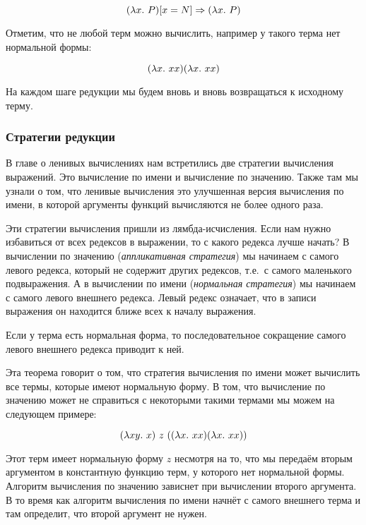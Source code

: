 \[ (\lambda x .\  P)[x = N] \Rightarrow (\lambda x .\  P) \]

Отметим, что не любой терм можно вычислить, например у такого
терма нет нормальной формы:

\[ (\lambda x .\  x x)(\lambda x .\  x x) \]

На каждом шаге редукции мы будем вновь и вновь возвращаться 
к исходному терму.  

\subsubsection{Стратегии редукции}

В главе о ленивых вычислениях нам встретились две стратегии
вычисления выражений. Это вычисление по имени и вычисление по 
значению. Также там мы узнали о том, что ленивые вычисления
это улучшенная версия вычисления по имени, в которой аргументы
функций вычисляются не более одного раза. 

Эти стратегии вычисления пришли из лямбда-исчисления.
Если нам нужно избавиться от всех редексов в выражении, 
то с какого редекса лучше начать? В вычислении по значению
(\emph{аппликативная стратегия})
мы начинаем с самого левого редекса, который не содержит других редексов,
т.е.~с самого маленького подвыражения. А в вычислении по имени
(\emph{нормальная стратегия})
мы начинаем с самого левого внешнего редекса. Левый редекс означает,
что в записи выражения он находится ближе всех к началу выражения.

\begin{Ltheorem}[Карри]

Если у терма есть нормальная форма, то последовательное 
сокращение самого левого внешнего редекса приводит к ней.

\end{Ltheorem}

Эта теорема говорит о том, что стратегия вычисления по имени
может вычислить все термы, которые имеют нормальную форму.
В том, что вычисление по значению может не справиться с 
некоторыми такими термами мы можем на следующем примере:

\[ (\lambda x y .\  x)\ z\ ((\lambda x .\  xx) (\lambda x .\  xx)) \]

Этот терм имеет нормальную форму $z$ несмотря на то, что
мы передаём вторым аргументом в константную функцию терм,
у которого нет нормальной формы. Алгоритм вычисления по значению
зависнет при вычислении второго аргумента. В то время как
алгоритм вычисления по имени начнёт с самого внешнего терма и там
определит, что второй аргумент не нужен.

